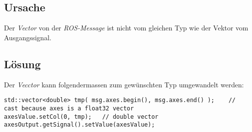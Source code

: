 \subsection{Ursache}
Der \textit{Vector} von der \textit{ROS-Message} ist nicht vom gleichen Typ wie der Vektor vom Ausgangssignal.

\subsection{Lösung}
Der \textit{Vecctor} kann folgendermassen zum gewünschten Typ umgewandelt werden:
\lstset{language=C++}
\begin{lstlisting}
std::vector<double> tmp( msg.axes.begin(), msg.axes.end() );	// cast because axes is a float32 vector
axesValue.setCol(0, tmp);	// double vector
axesOutput.getSignal().setValue(axesValue); 
\end{lstlisting}